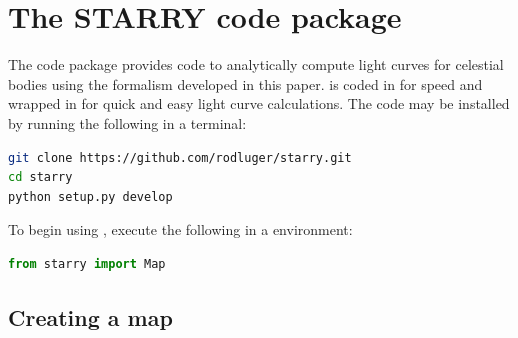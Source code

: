 \documentclass[modern]{aastex61}
\begin{document}
\section{The \textbf{STARRY} code package}
\label{sec:starrycode}

The \starry code package provides code to analytically
compute light curves for celestial bodies using the formalism developed
in this paper. \starry is coded in \C for speed and wrapped
in \Python for quick and easy light curve calculations. The
code may be installed by running the following in a terminal:
%
\begin{lstlisting}[language=bash]
git clone https://github.com/rodluger/starry.git
cd starry
python setup.py develop
\end{lstlisting}
%
To begin using \starry, execute the following in a \Python environment:
%
\begin{lstlisting}[language=Python]
from starry import Map
\end{lstlisting}
%

\subsection{Creating a map}
\label{sec:starrymap}
\end{document}
